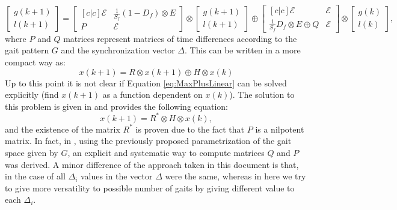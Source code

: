 \documentclass[main.tex]{subfiles}
\begin{document}
\begin{equation}
\begin{bmatrix}
g(k + 1) \\
l(k + 1)
\end{bmatrix} =
\begin{bmatrix}[c|c]
\mathcal{E} & \frac{1}{S_f}(1 - D_f) \otimes E \\ \hline
P & \mathcal{E}
\end{bmatrix} \otimes \begin{bmatrix}
g(k + 1) \\
l(k + 1)
\end{bmatrix} \oplus \begin{bmatrix}[c|c]
\mathcal{E} & \mathcal{E} \\ \hline
\frac{1}{S_f}D_f \otimes E \oplus Q& \mathcal{E}
\end{bmatrix} \otimes \begin{bmatrix}
g(k) \\
l(k)
\end{bmatrix},\label{eq:MaxPlusLinear}
\end{equation}  
where $P$ and $Q$ matrices represent matrices of time differences according to the gait pattern $G$ and the synchronization vector $\Delta$. This can be written in a more compact way as:
\begin{equation*}
x(k+1) = R \otimes x(k+1) \oplus H \otimes x(k)
\end{equation*}
Up to this point it is not clear if Equation \eqref{eq:MaxPlusLinear} can be solved explicitly (find $x(k+1)$ as a function dependent on $x(k)$). The solution to this problem is given in \cite{Lopes2009,Lopes2014} and provides the following equation:
\begin{equation*}
x(k+1) = R^* \otimes H \otimes x(k),
\end{equation*}
and the existence of the matrix $R^*$ is proven due to the fact that $P$ is a nilpotent matrix. In fact, in \cite{Lopes2009}, using the previously proposed parametrization of the gait space given by $G$, an explicit and systematic way to compute matrices $Q$ and $P$ was derived. A minor difference of the approach taken in this document is that, in the case of \cite{Lopes2009} all $\Delta_i$ values in the vector $\Delta$ were the same, whereas in here we try to give more versatility to possible number of gaits by giving different value to each $\Delta_i$.
\end{document}
